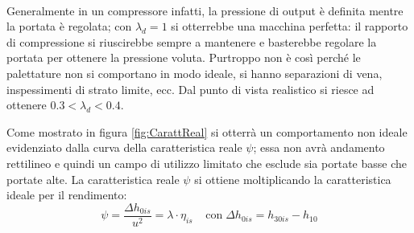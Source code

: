 \\Generalmente in un compressore infatti, la pressione di output è definita mentre la portata è regolata; con $\lambda_d = 1$ si otterrebbe una macchina perfetta: il rapporto di compressione si riuscirebbe sempre a mantenere e basterebbe regolare la portata per ottenere la pressione voluta. Purtroppo non è così perché le palettature non si comportano in modo ideale, si hanno separazioni di vena, inspessimenti di strato limite, ecc. Dal punto di vista realistico si riesce ad ottenere $0.3<\lambda_d<0.4$.

Come mostrato in figura \ref{fig:CarattReal} si otterrà un comportamento non ideale evidenziato dalla curva della caratteristica reale $\psi$; essa non avrà andamento rettilineo e quindi un campo di utilizzo limitato che esclude sia portate basse che portate alte. La caratteristica reale $\psi$ si ottiene moltiplicando la caratteristica ideale per il rendimento:
\begin{equation}
\psi = \frac{\Delta h_{0is}}{u^2} = \lambda \cdot \eta_{is} \;\;\;\; \text{con}\; \Delta h_{0is} = h_{30is} - h_{10}
\end{equation}

